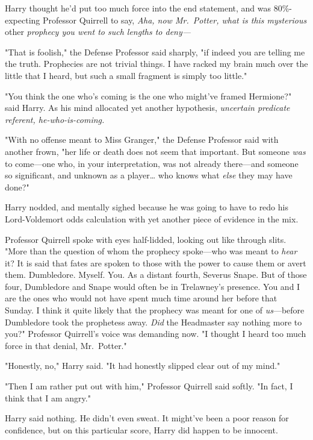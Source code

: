 Harry thought he'd put too much force into the end statement, and was 
80\%-expecting Professor Quirrell to say, \emph{Aha, now Mr.~Potter, what is 
this mysterious} other \emph{prophecy you went to such lengths to deny---}

"That is foolish," the Defense Professor said sharply, "if indeed you are 
telling me the truth. Prophecies are not trivial things. I have racked my brain 
much over the little that I heard, but such a small fragment is simply too 
little."

"You think the one who's coming is the one who might've framed Hermione?" said 
Harry. As his mind allocated yet another hypothesis, \emph{uncertain predicate 
referent, he-who-is-coming.}

"With no offense meant to Miss Granger," the Defense Professor said with 
another frown, "her life or death does not seem that important. But someone 
\emph{was} to come---one who, in your interpretation, was not already 
there---and someone so significant, and unknown as a player{\ldots} who knows 
what \emph{else} they may have done?"

Harry nodded, and mentally sighed because he was going to have to redo his 
Lord-Voldemort odds calculation with yet another piece of evidence in the mix.

Professor Quirrell spoke with eyes half-lidded, looking out like through slits. 
"More than the question of whom the prophecy spoke---who was meant to 
\emph{hear} it? It is said that fates are spoken to those with the power to 
cause them or avert them. Dumbledore. Myself. You. As a distant fourth, Severus 
Snape. But of those four, Dumbledore and Snape would often be in Trelawney's 
presence. You and I are the ones who would not have spent much time around her 
before that Sunday. I think it quite likely that the prophecy was meant for one 
of \emph{us}---before Dumbledore took the prophetess away. \emph{Did} the 
Headmaster say nothing more to you?" Professor Quirrell's voice was demanding 
now. "I thought I heard too much force in that denial, Mr.~Potter."

"Honestly, no," Harry said. "It had honestly slipped clear out of my mind."

"Then I am rather put out with him," Professor Quirrell said softly. "In fact, 
I think that I am angry."

Harry said nothing. He didn't even sweat. It might've been a poor reason for 
confidence, but on this particular score, Harry did happen to be innocent.


